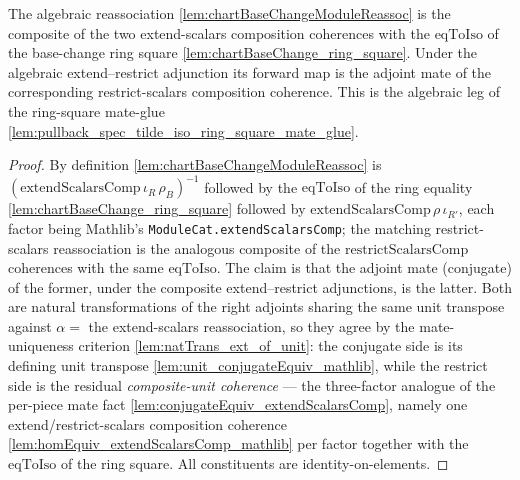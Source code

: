 \begin{lemma}

  \label{lem:chartBaseChangeModuleReassoc_extendScalarsComp}
  The algebraic reassociation \cref{lem:chartBaseChangeModuleReassoc} is the composite of the two
  extend-scalars composition coherences with the \(\mathrm{eqToIso}\) of the base-change ring square
  \cref{lem:chartBaseChange_ring_square}. Under the algebraic extend--restrict adjunction its forward
  map is the adjoint mate of the corresponding restrict-scalars composition coherence. This is the
  algebraic leg of the ring-square mate-glue
  \cref{lem:pullback_spec_tilde_iso_ring_square_mate_glue}.
  \begin{proof}
    By definition \cref{lem:chartBaseChangeModuleReassoc} is
    \((\mathrm{extendScalarsComp}\,\iota_R\,\rho_B)^{-1}\) followed by the \(\mathrm{eqToIso}\) of the
    ring equality \cref{lem:chartBaseChange_ring_square} followed by
    \(\mathrm{extendScalarsComp}\,\rho\,\iota_{R'}\), each factor being Mathlib's
    \texttt{ModuleCat.extendScalarsComp}; the matching restrict-scalars reassociation is the
    analogous composite of the \(\mathrm{restrictScalarsComp}\) coherences with the same
    \(\mathrm{eqToIso}\). The claim is that the adjoint mate (conjugate) of the former, under the
    composite extend--restrict adjunctions, is the latter. Both are natural transformations of the
    right adjoints sharing the same unit transpose against \(\alpha = \) the extend-scalars
    reassociation, so they agree by the mate-uniqueness criterion
    \cref{lem:natTrans_ext_of_unit}: the conjugate side is its defining unit transpose
    \cref{lem:unit_conjugateEquiv_mathlib}, while the restrict side is the residual
    \emph{composite-unit coherence} — the three-factor analogue of the per-piece mate fact
    \cref{lem:conjugateEquiv_extendScalarsComp}, namely one extend/restrict-scalars composition
    coherence \cref{lem:homEquiv_extendScalarsComp_mathlib} per factor together with the
    \(\mathrm{eqToIso}\) of the ring square. All constituents are identity-on-elements.

\end{proof}
\end{lemma}
